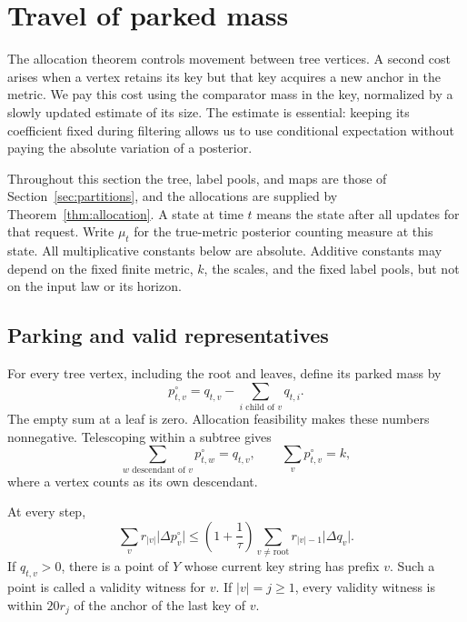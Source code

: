 \section{Travel of parked mass}\label{sec:travel}

The allocation theorem controls movement between tree vertices.  A second
cost arises when a vertex retains its key but that key acquires a new
anchor in the metric.  We pay this cost using the comparator mass in the
key, normalized by a slowly updated estimate of its size.  The estimate
is essential: keeping its coefficient fixed during filtering allows us
to use conditional expectation without paying the absolute variation of
a posterior.

Throughout this section the tree, label pools, and maps are those of
Section~\ref{sec:partitions}, and the allocations are supplied by
Theorem~\ref{thm:allocation}.  A state at time $t$ means the state after
all updates for that request.  Write $\mu_t$ for the true-metric posterior
counting measure at this state.  All multiplicative constants below are
absolute.  Additive constants may depend on the fixed finite metric,
$k$, the scales, and the fixed label pools, but not on the input law or
its horizon.

\subsection{Parking and valid representatives}

For every tree vertex, including the root and leaves, define its parked
mass by
\begin{equation}\label{eq:park-definition}
 p_{t,v}^{\circ}=q_{t,v}-\sum_{i\text{ child of }v}q_{t,i}.
\end{equation}
The empty sum at a leaf is zero.  Allocation feasibility makes these
numbers nonnegative.  Telescoping within a subtree gives
\begin{equation}\label{eq:park-subtree-total}
 \sum_{w\text{ descendant of }v}p_{t,w}^{\circ}=q_{t,v},
 \qquad \sum_v p_{t,v}^{\circ}=k,
\end{equation}
where a vertex counts as its own descendant.

\begin{lemma}\label{lem:park-variation}
At every step,
\begin{equation}\label{eq:park-variation}
 \sum_v r_{|v|}\lvert\Delta p_v^{\circ}\rvert
 \le \left(1+\frac1\tau\right)
       \sum_{v\ne\mathrm{root}}r_{|v|-1}\lvert\Delta q_v\rvert.
\end{equation}
If $q_{t,v}>0$, there is a point of $Y$ whose current key string has
prefix $v$.  Such a point is called a validity witness for $v$.  If
$|v|=j\ge1$, every validity witness is within $20r_j$ of the anchor of
the last key of $v$.
\end{lemma}

